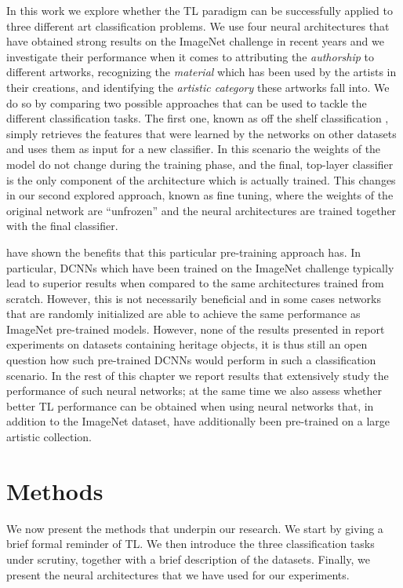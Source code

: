 In this work we explore whether the TL paradigm can be successfully applied to three different art classification problems. We use four neural architectures that have obtained strong results on the ImageNet challenge in recent years and we investigate their performance when it comes to attributing the \textit{authorship} to different artworks, recognizing the \textit{material} which has been used by the artists in their creations, and identifying the \textit{artistic category} these artworks fall into. We do so by comparing two possible approaches that can be used to tackle the different classification tasks. The first one, known as off the shelf classification \cite{razavian2014cnn}, simply retrieves the features that were learned by the networks on other datasets and uses them as input for a new classifier. In this scenario the weights of the model do not change during the training phase, and the final, top-layer classifier is the only component of the architecture which is actually trained. This changes in our second explored approach, known as fine tuning, where the weights of the original network are ``unfrozen'' and the neural architectures are trained together with the final classifier. 

\citet{kornblith2018better} have shown the benefits that this particular pre-training approach has. In particular, DCNNs which have been trained on the ImageNet challenge typically lead to superior results when compared to the same architectures trained from scratch. However, this is not necessarily beneficial and in some cases networks that are randomly initialized are able to achieve the same performance as ImageNet pre-trained models. However, none of the results presented in \cite{kornblith2018better} report experiments on datasets containing heritage objects, it is thus still an open question how such pre-trained DCNNs would perform in such a classification scenario. In the rest of this chapter we report results that extensively study the performance of such neural networks; at the same time we also assess whether better TL performance can be obtained when using neural networks that, in addition to the ImageNet dataset, have additionally been pre-trained on a large artistic collection.  


\section{Methods}
\label{sec:methods}

We now present the methods that underpin our research. We start by giving a brief formal reminder of TL. We then introduce the three classification tasks under scrutiny, together with a brief description of the datasets. Finally, we present the neural architectures that we have used for our experiments. 

